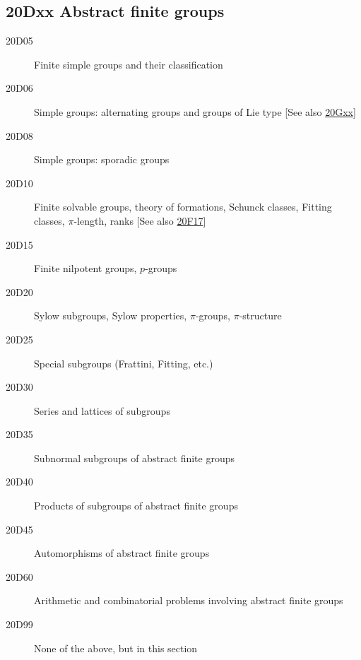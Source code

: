 \subsection*{20Dxx  Abstract finite groups }\label{20Dxx}
\begin{description}
\item [20D05]\label{20D05} Finite simple groups and their classification
\item [20D06]\label{20D06} Simple groups: alternating groups and groups of Lie type [See also \hyperref[20Gxx]{20Gxx}]
\item [20D08]\label{20D08} Simple groups: sporadic groups
\item [20D10]\label{20D10} Finite solvable groups, theory of formations, Schunck classes, Fitting classes, $\pi$-length, ranks [See also \hyperref[20F17]{20F17}]
\item [20D15]\label{20D15} Finite nilpotent groups, $p$-groups
\item [20D20]\label{20D20} Sylow subgroups, Sylow properties, $\pi$-groups, $\pi$-structure
\item [20D25]\label{20D25} Special subgroups (Frattini, Fitting, etc.)
\item [20D30]\label{20D30} Series and lattices of subgroups
\item [20D35]\label{20D35} Subnormal subgroups of abstract finite groups 
\item [20D40]\label{20D40} Products of subgroups of abstract finite groups 
\item [20D45]\label{20D45} Automorphisms of abstract finite groups 
\item [20D60]\label{20D60} Arithmetic and combinatorial problems involving abstract finite groups
\item [20D99]\label{20D99} None of the above, but in this section
\end{description}
